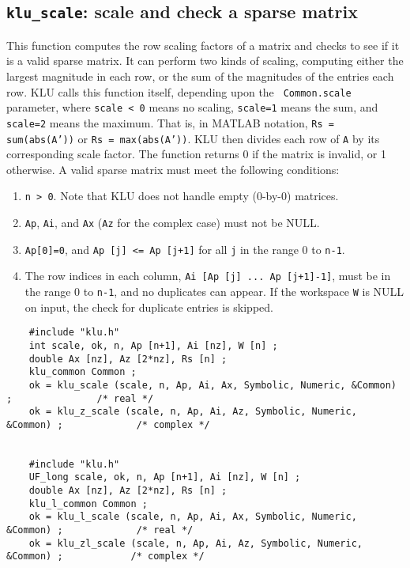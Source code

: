 \documentclass[11pt]{article}
\begin{document}
\subsection{{\tt klu\_scale}: scale and check a sparse matrix}

This function computes the row scaling factors of a matrix and checks to see if
it is a valid sparse matrix.  It can perform two kinds of scaling, computing
either the largest magnitude in each row, or the sum of the magnitudes of the
entries each row.  KLU calls this function itself, depending upon the {\tt
Common.scale} parameter, where {\tt scale < 0} means no scaling, {\tt scale=1}
means the sum, and {\tt scale=2} means the maximum.  That is, in MATLAB
notation, {\tt Rs = sum(abs(A'))} or {\tt Rs = max(abs(A'))}.  KLU then divides
each row of {\tt A} by its corresponding scale factor.  The function returns 0
if the matrix is invalid, or 1 otherwise.  A valid sparse matrix must meet the
following conditions:

\begin{enumerate}
\item {\tt n > 0}.  Note that KLU does not handle empty (0-by-0) matrices.
\item {\tt Ap}, {\tt Ai}, and {\tt Ax} ({\tt Az} for the complex case) must not be NULL.
\item {\tt Ap[0]=0}, and {\tt Ap [j] <= Ap [j+1]} for all {\tt j} in the range 0 to {\tt n-1}.
\item The row indices in each column, {\tt Ai [Ap [j] ... Ap [j+1]-1]}, must be in
the range 0 to {\tt n-1}, and no duplicates can appear.  If the workspace {\tt W} is
NULL on input, the check for duplicate entries is skipped.
\end{enumerate}

{\footnotesize
\begin{verbatim}
    #include "klu.h"
    int scale, ok, n, Ap [n+1], Ai [nz], W [n] ;
    double Ax [nz], Az [2*nz], Rs [n] ;
    klu_common Common ;
    ok = klu_scale (scale, n, Ap, Ai, Ax, Symbolic, Numeric, &Common) ;               /* real */
    ok = klu_z_scale (scale, n, Ap, Ai, Az, Symbolic, Numeric, &Common) ;             /* complex */


    #include "klu.h"
    UF_long scale, ok, n, Ap [n+1], Ai [nz], W [n] ;
    double Ax [nz], Az [2*nz], Rs [n] ;
    klu_l_common Common ;
    ok = klu_l_scale (scale, n, Ap, Ai, Ax, Symbolic, Numeric, &Common) ;             /* real */
    ok = klu_zl_scale (scale, n, Ap, Ai, Az, Symbolic, Numeric, &Common) ;            /* complex */
\end{verbatim}
}
\end{document}
